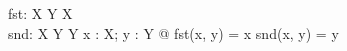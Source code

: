 \documentclass[a4paper,10pt,fleqn]{article}
\begin{document}
\begin{gendef}[X, Y]
  fst: X \cross Y \fun X \\
  snd: X \cross Y \fun Y
\where
  \forall x : X; y : Y @ fst(x, y) = x \land snd(x, y) = y
\end{gendef}
\end{document}
